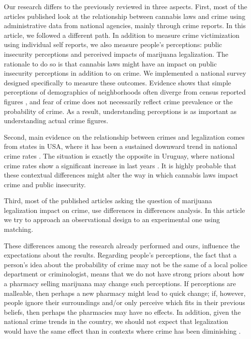 \documentclass[11pt]{article}
\begin{document}
Our research differs to the previously reviewed in three aspects. First, most of the articles published look at the relationship between cannabis laws and crime using administrative data from national agencies, mainly through crime reports. In this article, we followed a different path. In addition to measure crime victimization using individual self reports, we also measure people's perceptions: public insecurity perceptions and perceived impacts of marijuana legalization. The rationale to do so is that cannabis laws might have an impact on public insecurity perceptions in addition to on crime. We implemented a national survey designed specifically to measure these outcomes. Evidence shows that simple perceptions of demographics of neighborhoods often diverge from census reported figures \citep{wong2012bringing}, and fear of crime does not necessarily reflect crime prevalence or the probability of crime. As a result, understanding perceptions is as important as understanding actual crime figures.

Second, main evidence on the relationship between crimes and legalization comes from states in USA, where it has been a sustained downward trend in national crime rates \citep{gramlich5facts, james2018recent}. The situation is exactly the opposite in Uruguay, where national crime rates show a significant increase in last years \citep{del2018obstacles, paternain2008panorama, aboal2007crimen}. It is highly probable that these contextual differences might alter the way in which cannabis laws impact crime and public insecurity.

Third, most of the published articles asking the question of marijuana legalization impact on crime, use differences in differences analysis. In this article we try to approach an observational design to an experimental one using matching.

These differences among the research already performed and ours, influence the expectations about the results. Regarding people's perceptions, the fact that a person's idea about the probability of crime may not be the same of a local police department or criminologist, means that we do not have strong priors about how a pharmacy selling marijuana may change such perceptions. If perceptions are malleable, then perhaps a new pharmacy might lead to quick change; if, however, people ignore their surroundings and/or only perceive which fits in their previous beliefs, then perhaps the pharmacies may have no effects. In addition, given the national crime trends in the country, we should not expect that legalization would have the same effect than in contexts where crime has been diminishing \citep{eisner2016achieving}.
\end{document}
